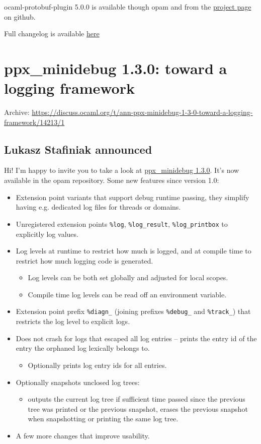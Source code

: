 \documentclass[11pt]{article}
\begin{document}
ocaml-protobuf-plugin 5.0.0 is available though opam and from the \href{https://github.com/andersfugmann/ocaml-protoc-plugin}{project
page} on github.

Full changelog is available \href{https://github.com/andersfugmann/ocaml-protoc-plugin/releases}{here} 
\section*{ppx\_minidebug 1.3.0: toward a logging framework}
\label{6}
Archive: \url{https://discuss.ocaml.org/t/ann-ppx-minidebug-1-3-0-toward-a-logging-framework/14213/1}
\subsection*{Lukasz Stafiniak announced}
\label{sec:org9f8659c}


Hi! I'm happy to invite you to take a look at \href{https://github.com/lukstafi/ppx\_minidebug}{ppx\_minidebug 1.3.0}. It's now available in
the opam repository. Some new features since version 1.0:

\begin{itemize}
\item Extension point variants that support debug runtime passing, they simplify having e.g. dedicated log files for threads or domains.
\item Unregistered extension points \texttt{\%log}, \texttt{\%log\_result}, \texttt{\%log\_printbox} to explicitly log values.
\item Log levels at runtime to restrict how much is logged, and at compile time to restrict how much logging code is generated.
\begin{itemize}
\item Log levels can be both set globally and adjusted for local scopes.
\item Compile time log levels can be read off an environment variable.
\end{itemize}
\item Extension point prefix \texttt{\%diagn\_} (joining prefixes \texttt{\%debug\_} and \texttt{\%track\_}) that restricts the log level to explicit logs.
\item Does not crash for logs that escaped all log entries -- prints the entry id of the entry the orphaned log lexically belongs to.
\begin{itemize}
\item Optionally prints log entry ids for all entries.
\end{itemize}
\item Optionally snapshots unclosed log trees:
\begin{itemize}
\item outputs the current log tree if sufficient time passed since the previous tree was printed or the previous snapshot, erases the previous snapshot when snapshotting or printing the same log tree.
\end{itemize}
\item A few more changes that improve usability.
\end{itemize}
\end{document}
